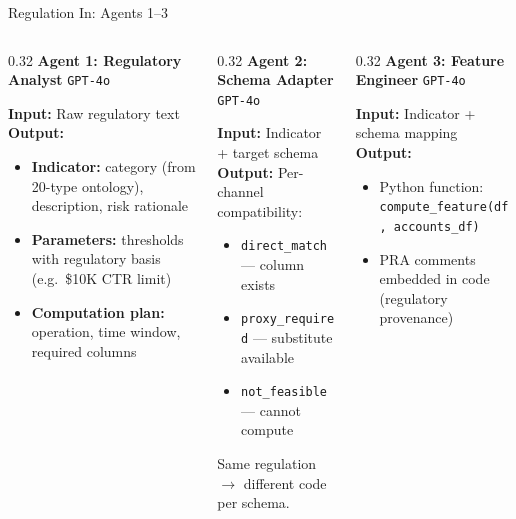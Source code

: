 \documentclass[10pt, aspectratio=169]{beamer}
\newcommand{\hlt}[1]{\textcolor{accentcyan}{#1}}
\newcommand{\hlp}[1]{\textcolor{accentpurple}{#1}}
\newcommand{\hlg}[1]{\textcolor{accentgreen}{#1}}
\newcommand{\hlo}[1]{\textcolor{accentorange}{#1}}
\newcommand{\hlr}[1]{\textcolor{accentred}{#1}}
\begin{document}
\begin{frame}{Regulation In: Agents 1--3}

\begin{columns}[T]
\begin{column}{0.32\textwidth}
  \textbf{\hlp{Agent 1: Regulatory Analyst}} {\tiny\texttt{GPT-4o}}
  \vspace{0.3em}

  \scriptsize
  \textbf{Input:} Raw regulatory text\\[0.3em]
  \textbf{Output:}
  \begin{itemize}\itemsep0.15em
    \item \textbf{Indicator:} category (from 20-type ontology), description, risk rationale
    \item \textbf{Parameters:} thresholds with regulatory basis (e.g.\ \$10K CTR limit)
    \item \textbf{Computation plan:} operation, time window, required columns
  \end{itemize}
\end{column}

\begin{column}{0.32\textwidth}
  \textbf{\hlp{Agent 2: Schema Adapter}} {\tiny\texttt{GPT-4o}}
  \vspace{0.3em}

  \scriptsize
  \textbf{Input:} Indicator + target schema\\[0.3em]
  \textbf{Output:} Per-channel compatibility:
  \begin{itemize}\itemsep0.15em
    \item \hlg{\texttt{direct\_match}} --- column exists
    \item \hlo{\texttt{proxy\_required}} --- substitute available
    \item \hlr{\texttt{not\_feasible}} --- cannot compute
  \end{itemize}

  \vspace{0.3em}
  Same regulation \(\to\) different code per schema.
\end{column}

\begin{column}{0.32\textwidth}
  \textbf{\hlt{Agent 3: Feature Engineer}} {\tiny\texttt{GPT-4o}}
  \vspace{0.3em}

  \scriptsize
  \textbf{Input:} Indicator + schema mapping\\[0.3em]
  \textbf{Output:}
  \begin{itemize}\itemsep0.15em
    \item Python function:\\
      \texttt{compute\_feature(df, accounts\_df)}
    \item PRA comments embedded in code (regulatory provenance)
  \end{itemize}


\end{column}
\end{columns}
\end{frame}
\end{document}
